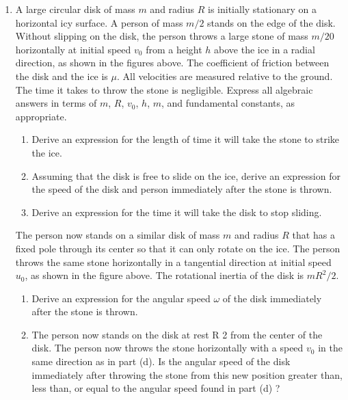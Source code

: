 \documentclass{../../../oss-apphys}
\begin{document}
\begin{enumerate}[leftmargin=15pt]
  \begin{center}
    \end{center}
\item A large circular disk of mass $m$ and radius $R$ is initially stationary
  on a horizontal icy surface. A person of mass $m/2$ stands on the edge of the
  disk. Without slipping on the disk, the person throws a large stone of mass
  $m/20$ horizontally at initial speed $v_0$ from a height $h$ above the ice in
  a radial direction, as shown in the figures above. The coefficient of
  friction between the disk and the ice is $\mu$. All velocities are measured
  relative to the ground. The time it takes to throw the stone is negligible.
  Express all algebraic answers in terms of $m$, $R$, $v_0$, $h$, $m$, and
  fundamental constants, as appropriate.
  \begin{enumerate}[leftmargin=15pt]
  \item Derive an expression for the length of time it will take the stone to
    strike the ice.
  \item Assuming that the disk is free to slide on the ice, derive an
    expression for the speed of the disk and person immediately after the stone
    is thrown.
  \item Derive an expression for the time it will take the disk to stop sliding.
  \end{enumerate}
  \newpage
  \begin{center}
  \end{center}
  The person now stands on a similar disk of mass $m$ and radius $R$ that has a
  fixed pole through its center so that it can only rotate on the ice. The
  person throws the same stone horizontally in a tangential direction at
  initial speed $u_0$, as shown in the figure above. The rotational inertia of
  the disk is $mR^2/2$.
  \begin{enumerate}[leftmargin=15pt,resume]
  \item Derive an expression for the angular speed $\omega$ of the disk
    immediately after the stone is thrown.
    \vspace{1.5in}
  \item The person now stands on the disk at rest R 2 from the center of the
    disk. The person now throws the stone horizontally with a speed $v_0$ in
    the same direction as in part (d). Is the angular speed of the disk
    immediately after throwing the stone from this new position greater than,
    less than, or equal to the angular speed found in part (d) ?


\end{enumerate}
\end{enumerate}
\end{document}
